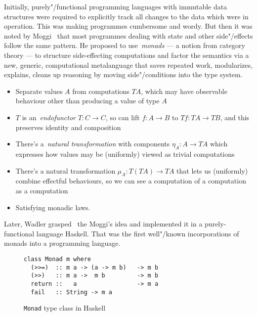 
Initially, purely"/functional programming languages with immutable data structures
were required to explicitly track all changes to the data which were in operation.
This was making programmes cumbersome and wordy. But then it was noted by
Moggi~\cite{Moggi:1991:NCM:116981.116984} that most programmes dealing with
state and other side"/effects follow the same pattern. He proposed to
use~\emph{monads} --- a notion from category theory --- to structure side-effecting
computations and factor the semantics via a new, generic, computational metalanguage that
saves repeated work, modularizes, explains, cleans up reasoning by moving side"/conditions
into the type system.

\begin{itemize}
\item Separate values $A$ from computations $T A$, which may have observable
behaviour other than producing a value of type $A$
\item $T$ is an~\emph{endofunctor} $T:C \rightarrow C$, so can
lift $f:A \rightarrow B$ to $T f:T A \rightarrow T B$, and this preserves
identity and composition
\item There’s a~\emph{natural transformation} with components
 $\eta_A : A \rightarrow T A$ which expresses how values may be
(uniformly) viewed as trivial computations
\item There’s a natural transformation $\mu_A : T (T A) \rightarrow T A$ that lets
us (uniformly) combine effectful behaviours, so we can see a computation of
a computation as a computation
\item Satisfying monadic laws.
\end{itemize}

Later, Wadler grasped~\cite{Wadler:1992:EFP:143165.143169} the Moggi's idea and
implemented it in a purely-functional language Haskell. That was the first
well"/known incorporations of monads into a
programming language.

    \begin{figure}[h]
    \begin{lstlisting}
class Monad m where
  (>>=)  :: m a -> (a -> m b)   -> m b
  (>>)   :: m a ->  m b         -> m b
  return ::   a                 -> m a
  fail   :: String -> m a
    \end{lstlisting}
    \caption{\texttt{Monad} type class in Haskell}
    \label{listing:monadClass}
    \end{figure}

